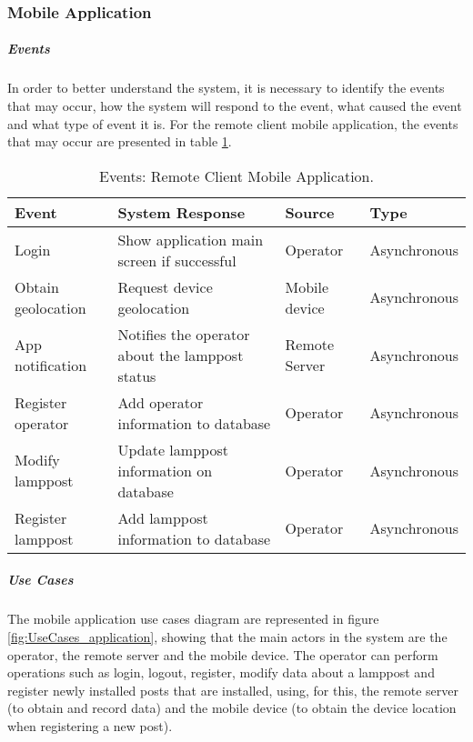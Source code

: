 \subsubsection*{Mobile Application}
\subparagraph*{Events}
In order to better understand the system, it is necessary to identify the events that may occur, how the system will respond to the event, what caused the event and what type of event it is. For the remote client mobile application, the events that may occur are presented in table \ref{table:rc_app_events}.

\begin{table}[ht]
	\centering
	\resizebox{\columnwidth}{!}
	{
		\begin{tabular}{|m{3cm}|m{5cm}|m{2.4cm}|m{2.4cm}|}
			\hline
			\textbf{Event} & \textbf{System Response} & \textbf{Source} & \textbf{Type}\\
			\hline\hline
			Login & Show application main screen if successful & Operator & Asynchronous\\
			\hline
			
			Obtain geolocation & Request device geolocation & Mobile device & Asynchronous\\
			\hline
			
			App notification & Notifies the operator about the lamppost status & Remote Server & Asynchronous\\
			\hline
			
			Register operator & Add operator information to database & Operator & Asynchronous\\
			\hline
			
			Modify lamppost & Update lamppost information on database & Operator & Asynchronous\\
			\hline
			
			Register lamppost & Add lamppost information to database & Operator & Asynchronous\\
			\hline			
		\end{tabular}
	}
	\caption{Events: Remote Client Mobile Application.}
	\label{table:rc_app_events}
\end{table}

\subparagraph*{Use Cases}
The mobile application use cases diagram are represented in figure \ref{fig:UseCases_application}, showing that the main actors in the system are the operator, the remote server and the mobile device. The operator can perform operations such as login, logout, register, modify data about a lamppost and register newly installed posts that are installed, using, for this, the remote server (to obtain and record data) and the mobile device (to obtain the device location when registering a new post).

